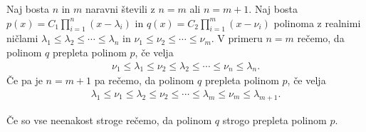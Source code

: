 \begin{definicija}\label{prepletena-polinoma}
    Naj bosta \(n\) in \(m\) naravni števili z \(n=m\) ali \(n=m+1\). Naj bosta \(p(x) = C_1 \prod_{i=1}^n (x-\lambda_i)\) in \(q(x) = C_2 \prod_{i=1}^m (x-\nu_i)\) polinoma z realnimi ničlami \(\lambda_1 \leq \lambda_2 \leq \cdots \leq \lambda_n\) in \(\nu_1 \leq \nu_2 \leq \cdots \leq \nu_m\). V primeru \(n=m\) rečemo, da polinom \(q\) prepleta polinom \(p\), če velja
    \begin{align*}
        \nu_1 \leq \lambda_1 \leq \nu_2 \leq \lambda_2 \leq \cdots \leq \nu_n \leq \lambda_n.
    \end{align*}
    Če pa je \(n=m+1\) pa rečemo, da polinom \(q\) prepleta polinom \(p\), če velja
    \begin{align*}
        \lambda_1 \leq \nu_1 \leq \lambda_2 \leq \nu_2 \leq \cdots \leq \lambda_m \leq \nu_m \leq \lambda_{m+1}.
    \end{align*}

    Če so vse neenakost stroge rečemo, da polinom \(q\) strogo prepleta polinom \(p\).
\end{definicija}


